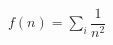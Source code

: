 \documentclass[preview]{standalone}
\begin{document}
\begin{center}
$f(n) = \sum_i\dfrac{1}{n^2}$
\end{center}
\end{document}

